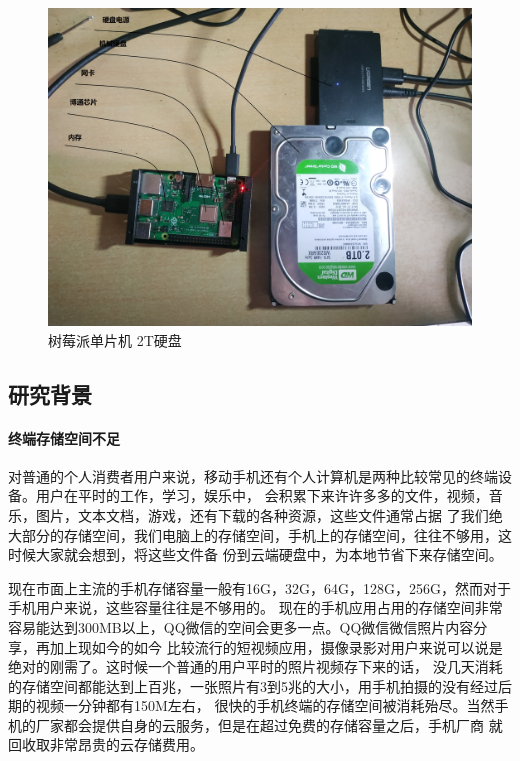 \begin{figure}[H]
  \centering
  \includegraphics[width=130mm]{./figures/rasberry.jpg}
  \caption{树莓派单片机 2T硬盘}
  \label{raspberrypi}
\end{figure}


\subsection{研究背景}
\paragraph{终端存储空间不足}
对普通的个人消费者用户来说，移动手机还有个人计算机是两种比较常见的终端设备。用户在平时的工作，学习，娱乐中，
会积累下来许许多多的文件，视频，音乐，图片，文本文档，游戏，还有下载的各种资源，这些文件通常占据
了我们绝大部分的存储空间，我们电脑上的存储空间，手机上的存储空间，往往不够用，这时候大家就会想到，将这些文件备
份到云端硬盘中，为本地节省下来存储空间\cite{r7,r9,r10}。

现在市面上主流的手机存储容量一般有16G，32G，64G，128G，256G，然而对于手机用户来说，这些容量往往是不够用的。
现在的手机应用占用的存储空间非常容易能达到300MB以上，QQ微信的空间会更多一点。QQ微信微信照片内容分享，再加上现如今的如今
比较流行的短视频应用，摄像录影对用户来说可以说是绝对的刚需了。这时候一个普通的用户平时的照片视频存下来的话，
没几天消耗的存储空间都能达到上百兆，一张照片有3到5兆的大小，用手机拍摄的没有经过后期的视频一分钟都有150M左右，
很快的手机终端的存储空间被消耗殆尽。当然手机的厂家都会提供自身的云服务，但是在超过免费的存储容量之后，手机厂商
就回收取非常昂贵的云存储费用。


